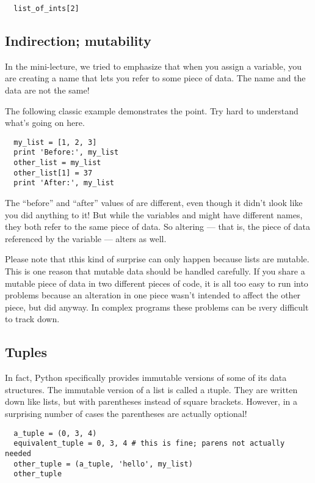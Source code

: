 \documentclass[letterpaper, 12pt, titlepage, twoside]{article}
\begin{document}
\begin{lstlisting}
  list_of_ints[2]
\end{lstlisting}

\subsection*{Indirection; mutability}

In the mini-lecture, we tried to emphasize that when you assign a variable,
you are creating a name that lets you refer to some piece of data. The name
and the data are not the same!

The following classic example demonstrates the point. Try hard to understand
what's going on here.

\begin{lstlisting}
  my_list = [1, 2, 3]
  print 'Before:', my_list
  other_list = my_list
  other_list[1] = 37
  print 'After:', my_list
\end{lstlisting}

The ``before'' and ``after'' values of  are different, even though
it didn't \i{look} like you did anything to it! But while the variables
 and  might have different names, they both refer
to the same piece of data. So altering  --- that is, the piece
of data referenced by the variable  --- alters  as
well.

Please note that \i{this kind of surprise can only happen because lists are
  mutable.} This is one reason that mutable data should be handled carefully.
If you share a mutable piece of data in two different pieces of code, it is
all too easy to run into problems because an alteration in one piece wasn't
intended to affect the other piece, but did anyway. In complex programs these
problems can be \i{very} difficult to track down.

\subsection*{Tuples}

In fact, Python specifically provides immutable versions of some of its data
structures. The immutable version of a list is called a \i{tuple}. They are
written down like lists, but with parentheses instead of square brackets.
However, in a surprising number of cases the parentheses are actually
optional!

\begin{lstlisting}
  a_tuple = (0, 3, 4)
  equivalent_tuple = 0, 3, 4 # this is fine; parens not actually needed
  other_tuple = (a_tuple, 'hello', my_list)
  other_tuple
\end{lstlisting}
\end{document}
